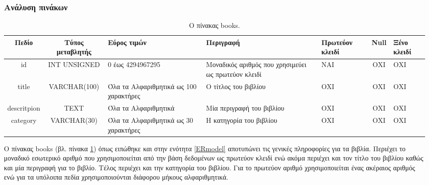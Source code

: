 \documentclass{assignment}
\begin{document}
\begin{landscape}
\subsubsection{Ανάλυση πινάκων}

\begin{table}[htbp]
\begin{center}
  \begin{tabular}{|c|c|m{}|m{}|m{2.0cm}|c|m{1.5cm}|}
    \hline
    {\bf Πεδίο} & {\bf Τύπος μεταβλητής} & {\bf Εύρος τιμών} & {\bf Περιγραφή} & {\bf Πρωτεύον κλειδί} & {\bf Null} & {\bf Ξένο κλειδί} \\ \hline
    id & INT UNSIGNED & 0 έως 4294967295 & Μοναδικός αριθμός που χρησιμεύει ως πρωτεύον κλειδί & ΝΑΙ & ΟΧΙ & ΟΧΙ \\ \hline
    title & VARCHAR(100) & Όλα τα Αλφαριθμητικά ως 100 χαρακτήρες & Ο τίτλος του βιβλίου & ΟΧΙ & ΟΧΙ & ΟΧΙ \\ \hline
    descritpion & TEXT & Όλα τα Αλφαριθμητικά & Μία περιγραφή του βιβλίου & ΟΧΙ & ΟΧΙ & ΟΧΙ \\ \hline
    category & VARCHAR(30) & Όλα τα Αλφαριθμητικά ως 30 χαρακτήρες & Η κατηγορία του βιβλίου & ΟΧΙ & ΟΧΙ & ΟΧΙ \\ \hline
  \end{tabular}
\caption{Ο πίνακας books.}
\label{table:db_table:books}
\end{center}
\end{table}

Ο πίνακας books (βλ. πίνακα \ref{table:db_table:books}) όπως ειπώθηκε και στην ενότητα \ref{ERmodel} αποτυπώνει τις γενικές πληροφορίες για τα βιβλία. Περιέχει το μοναδικό εσωτερικό αριθμό που χρησιμοποιείται από την βάση δεδομένων ως πρωτεύον κλειδί ενώ ακόμα περιέχει και τον τίτλο του βιβλίου καθώς και μία περιγραφή για το βιβλίο. Τέλος περιέχει και την κατηγορία του βιβλίου. Για το πρωτεύον αριθμό χρησιμοποιείται ένας ακέραιος αριθμός ενώ για τα υπόλοιπα πεδία χρησιμοποιούνται διάφορου μήκους αλφαριθμητικά.

\end{landscape}
\end{document}
